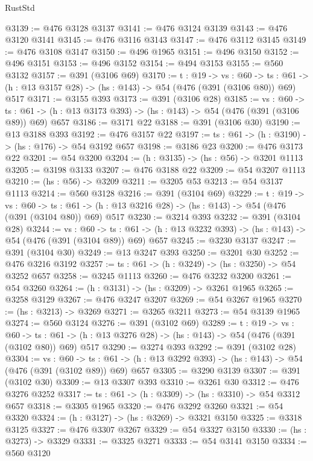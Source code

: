 \begin{lexlean}{RustStd}
\begin{coremodule}
@3139 := @476 @3128 @3137
@3141 := @476 @3124 @3139
@3143 := @476 @3120 @3141
@3145 := @476 @3116 @3143
@3147 := @476 @3112 @3145
@3149 := @476 @3108 @3147
@3150 := @496 @1965
@3151 := @496 @3150
@3152 := @496 @3151
@3153 := @496 @3152
@3154 := @494 @3153
@3155 := @560 @3132
@3157 := @391 (@3106 @69)
@3170 := {t : @19} ->
  {vs : @60} ->
  {ts : @61} -> (h : @13 @3157 @28) -> (hs : @143) -> @54 (@476 (@391 (@3106 @80)) @69) @517
@3171 := @3155 @393
@3173 := @391 (@3106 @28)
@3185 := {vs : @60} ->
  {ts : @61} -> (h : @13 @3173 @393) -> (hs : @143) -> @54 (@476 (@391 (@3106 @89)) @69) @657
@3186 := @3171 @22
@3188 := @391 (@3106 @30)
@3190 := @13 @3188 @393
@3192 := @476 @3157 @22
@3197 := {ts : @61} -> (h : @3190) -> (hs : @176) -> @54 @3192 @657
@3198 := @3186 @23
@3200 := @476 @3173 @22
@3201 := @54 @3200
@3204 := (h : @3135) -> (hs : @56) -> @3201 @1113
@3205 := @3198 @3133
@3207 := @476 @3188 @22
@3209 := @54 @3207 @1113
@3210 := (hs : @56) -> @3209
@3211 := @3205 @53
@3213 := @54 @3137 @1113
@3214 := @560 @3128
@3216 := @391 (@3104 @69)
@3229 := {t : @19} ->
  {vs : @60} ->
  {ts : @61} -> (h : @13 @3216 @28) -> (hs : @143) -> @54 (@476 (@391 (@3104 @80)) @69) @517
@3230 := @3214 @393
@3232 := @391 (@3104 @28)
@3244 := {vs : @60} ->
  {ts : @61} -> (h : @13 @3232 @393) -> (hs : @143) -> @54 (@476 (@391 (@3104 @89)) @69) @657
@3245 := @3230 @3137
@3247 := @391 (@3104 @30)
@3249 := @13 @3247 @393
@3250 := @3201 @30
@3252 := @476 @3216 @3192
@3257 := {ts : @61} -> (h : @3249) -> (hs : @3250) -> @54 @3252 @657
@3258 := @3245 @1113
@3260 := @476 @3232 @3200
@3261 := @54 @3260
@3264 := (h : @3131) -> (hs : @3209) -> @3261 @1965
@3265 := @3258 @3129
@3267 := @476 @3247 @3207
@3269 := @54 @3267 @1965
@3270 := (hs : @3213) -> @3269
@3271 := @3265 @3211
@3273 := @54 @3139 @1965
@3274 := @560 @3124
@3276 := @391 (@3102 @69)
@3289 := {t : @19} ->
  {vs : @60} ->
  {ts : @61} -> (h : @13 @3276 @28) -> (hs : @143) -> @54 (@476 (@391 (@3102 @80)) @69) @517
@3290 := @3274 @393
@3292 := @391 (@3102 @28)
@3304 := {vs : @60} ->
  {ts : @61} -> (h : @13 @3292 @393) -> (hs : @143) -> @54 (@476 (@391 (@3102 @89)) @69) @657
@3305 := @3290 @3139
@3307 := @391 (@3102 @30)
@3309 := @13 @3307 @393
@3310 := @3261 @30
@3312 := @476 @3276 @3252
@3317 := {ts : @61} -> (h : @3309) -> (hs : @3310) -> @54 @3312 @657
@3318 := @3305 @1965
@3320 := @476 @3292 @3260
@3321 := @54 @3320
@3324 := (h : @3127) -> (hs : @3269) -> @3321 @3150
@3325 := @3318 @3125
@3327 := @476 @3307 @3267
@3329 := @54 @3327 @3150
@3330 := (hs : @3273) -> @3329
@3331 := @3325 @3271
@3333 := @54 @3141 @3150
@3334 := @560 @3120

\end{coremodule}
\end{lexlean}
